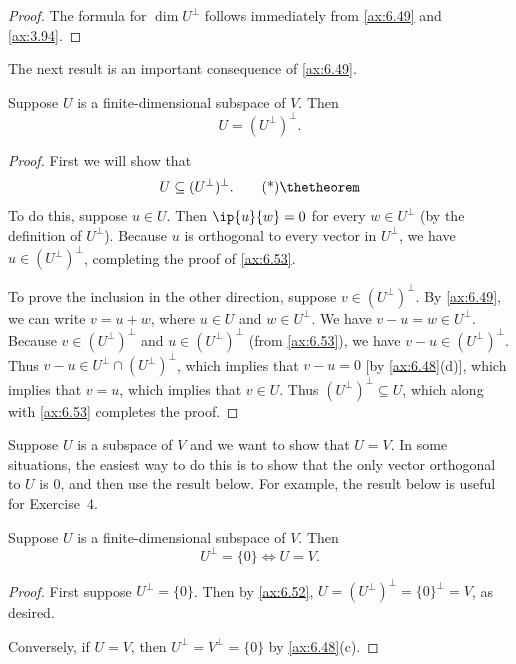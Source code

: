 \begin{proof}
The formula for $\dim U^\perp$ follows immediately from \ref{ax:6.49} and
\ref{ax:3.94}.
\end{proof}

The next result is an important consequence of \ref{ax:6.49}.

\begin{result}\label{ax:6.52}
Suppose $U$ is a finite-dimensional subspace of $V$. Then
\[ U = (U^\perp)^\perp. \]
\end{result}

\begin{proof}
First we will show that
\begin{equation*}
U \subseteq (U^\perp)^\perp. \axeqtag
\end{equation*}
To do this, suppose $u\in U$. Then $\ip{u}{w}=0$ for every $w\in U^\perp$ (by
the definition of $U^\perp$). Because $u$ is orthogonal to every vector in
$U^\perp$, we have $u\in(U^\perp)^\perp$, completing the proof of
\ref{ax:6.53}.

To prove the inclusion in the other direction, suppose
$v\in(U^\perp)^\perp$. By \ref{ax:6.49}, we can write $v=u+w$, where $u\in U$
and $w\in U^\perp$. We have $v-u=w\in U^\perp$. Because $v\in(U^\perp)^\perp$
and $u\in(U^\perp)^\perp$ (from \ref{ax:6.53}), we have
$v-u\in(U^\perp)^\perp$. Thus $v-u\in U^\perp\cap(U^\perp)^\perp$, which
implies that $v-u=0$ [by \ref{ax:6.48}(d)], which implies that $v=u$, which
implies that $v\in U$. Thus $(U^\perp)^\perp\subseteq U$, which along with
\ref{ax:6.53} completes the proof.
\end{proof}

%
Suppose $U$ is a subspace of $V$ and we want to show that $U=V$. In some
situations, the easiest way to do this is to show that the only vector
orthogonal to $U$ is $0$, and then use the result below. For example, the
result below is useful for Exercise~4.

\begin{result}[$U^\perp=\{0\}\iff U=V$ (for $U$ a finite-dimensional subspace
of $V$)]\label{ax:6.54}
Suppose $U$ is a finite-dimensional subspace of $V$. Then
\[ U^\perp=\{0\} \iff U=V. \]
\end{result}

\begin{proof}
First suppose $U^\perp=\{0\}$. Then by \ref{ax:6.52},
$U=(U^\perp)^\perp=\{0\}^\perp=V$, as desired.

Conversely, if $U=V$, then $U^\perp=V^\perp=\{0\}$ by \ref{ax:6.48}(c).
\end{proof}

